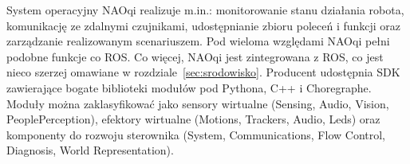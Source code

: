 System operacyjny NAOqi realizuje m.in.: monitorowanie stanu działania robota, komunikację ze zdalnymi czujnikami, udostępnianie zbioru poleceń i funkcji oraz zarządzanie realizowanym scenariuszem. Pod wieloma względami NAOqi pełni podobne funkcje co ROS. Co więcej, NAOqi jest zintegrowana z ROS, co jest nieco szerzej omawiane w rozdziale~\ref{sec:srodowisko}. Producent udostępnia SDK zawierające bogate biblioteki modułów pod Pythona, C++ i Choregraphe. Moduły można zaklasyfikować jako sensory wirtualne (Sensing, Audio, Vision, PeoplePerception), efektory wirtualne (Motions, Trackers, Audio, Leds) oraz komponenty do rozwoju sterownika (System, Communications, Flow Control, Diagnosis, World Representation).

